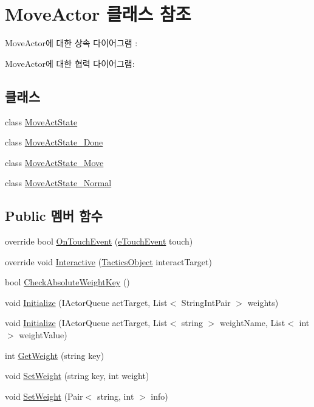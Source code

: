 \hypertarget{class_move_actor}{}\section{Move\+Actor 클래스 참조}
\label{class_move_actor}


Move\+Actor에 대한 상속 다이어그램 \+: 


Move\+Actor에 대한 협력 다이어그램\+:
\subsection*{클래스}
\begin{DoxyCompactItemize}
\item 
class \hyperlink{class_move_actor_1_1_move_act_state}{Move\+Act\+State}
\item 
class \hyperlink{class_move_actor_1_1_move_act_state___done}{Move\+Act\+State\+\_\+\+Done}
\item 
class \hyperlink{class_move_actor_1_1_move_act_state___move}{Move\+Act\+State\+\_\+\+Move}
\item 
class \hyperlink{class_move_actor_1_1_move_act_state___normal}{Move\+Act\+State\+\_\+\+Normal}
\end{DoxyCompactItemize}
\subsection*{Public 멤버 함수}
\begin{DoxyCompactItemize}
\item 
override bool \hyperlink{class_move_actor_abbb2fe6a87e45fe6a4f7eeec674558d6}{On\+Touch\+Event} (\hyperlink{_touch_manager_8cs_ae33e321a424fe84ba8b2fdb81ad40a68}{e\+Touch\+Event} touch)
\item 
override void \hyperlink{class_move_actor_ade9f1263ef53ad85968cf6cae50d6139}{Interactive} (\hyperlink{class_tactics_object}{Tactics\+Object} interact\+Target)
\item 
bool \hyperlink{class_m_c_n_1_1_actor_a493bb0a37cb9fc5b1aa8507ec69b04ac}{Check\+Absolute\+Weight\+Key} ()
\item 
void \hyperlink{class_m_c_n_1_1_actor_a27b307fecbbbf3aa53f8b5683de7ff36}{Initialize} (I\+Actor\+Queue act\+Target, List$<$ String\+Int\+Pair $>$ weights)
\item 
void \hyperlink{class_m_c_n_1_1_actor_ae5856541ad65c2c0ecc055414d20df0f}{Initialize} (I\+Actor\+Queue act\+Target, List$<$ string $>$ weight\+Name, List$<$ int $>$ weight\+Value)
\item 
int \hyperlink{class_m_c_n_1_1_actor_af264703ef93c3c77b5b7062aef828205}{Get\+Weight} (string key)
\item 
void \hyperlink{class_m_c_n_1_1_actor_a8d8020782aefa7fff625f5f8e09f7539}{Set\+Weight} (string key, int weight)
\item 
void \hyperlink{class_m_c_n_1_1_actor_a4337ef4d88c2086f18db4f2e6415eddd}{Set\+Weight} (Pair$<$ string, int $>$ info)
\end{DoxyCompactItemize}
